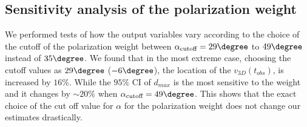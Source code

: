\subsection{Sensitivity analysis of the polarization weight}
%
\label{sec:sensitivityTests}
We performed tests of how the output variables vary according to the
choice of the cutoff of the polarization weight between
$\alpha_{\text{cutoff}} =
29 \degree$ to $49\degree$ instead of $35 \degree$.  
We found that in the most extreme case, choosing the cutoff values as $29
\degree$ ($-6 \degree$), the location of the $v_{3D}(t_{obs})$, is
increased by $ 16 \%$. While the $95\%$ CI of $d_{max}$ is
the most sensitive to the weight and it changes by
$\sim20 \%$ when $\alpha_{\text{cutoff}} = 49 \degree$. 
This shows that the exact choice of the cut off value for $\alpha$ for the
polarization weight does not change our estimates drastically.



